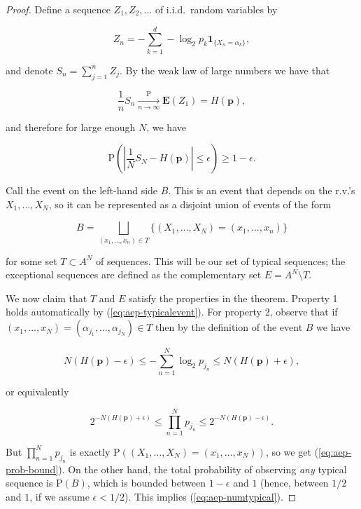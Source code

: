 \begin{proof}
Define a sequence $Z_1, Z_2, \ldots$ of i.i.d.\
random variables by

\[
Z_n = -\sum_{k=1}^d -\log_2 p_k \mathbf{1}_{\{X_n = \alpha_k\}},
\]

\noindent and denote $S_n = \sum_{j=1}^n Z_j$. By the weak law
of large numbers we have that

\[
\frac{1}{n} S_n \xrightarrow[n\to\infty]{\textrm{P}} \mathbf{E}(Z_1) = H(\mathbf{p}),
\]

\noindent and therefore for large enough $N$, we have

\begin{equation*} \tag{28}\label{eq:aep-typicalevent}
\mathrm{P}\left(\left|\frac{1}{N}S_N- H(\mathbf{p})\right|\le \epsilon \right)\ge 1-\epsilon.
\end{equation*}

\noindent Call the event on the left-hand side $B$. This is an
event that depends on the r.v.'s $X_1,\ldots,X_N$, so
it can be represented as a disjoint union of events of
the form

\[
B = \bigsqcup_{(x_1,\ldots,x_n)\in T} \{ (X_1,\ldots,X_N) = (x_1,\ldots,x_n) \}
\]

\noindent for some set $T\subset A^N$ of sequences. This will
be our set of typical sequences; the exceptional
sequences are defined as the complementary set
$E = A^N\setminus T$.

We now claim that $T$ and $E$ satisfy the properties
in the theorem. Property 1 holds automatically by
(\ref{eq:aep-typicalevent}). For property 2, observe that
if
$(x_1,\ldots,x_N)=(\alpha_{j_1},\ldots,\alpha_{j_N})\in
T$
then by the definition of the event $B$ we have

\[
N\left(H(\mathbf{p}) - \epsilon\right) \le
-\sum_{n=1}^N \log_2 p_{j_n} \le N\left(H(\mathbf{p}) + \epsilon\right),
\]

\noindent or equivalently

\[
2^{-N\left(H(\mathbf{p}) + \epsilon\right)} \le
\prod_{n=1}^N p_{j_n} \le
2^{-N\left(H(\mathbf{p}) - \epsilon\right)}.
\]

\noindent But $\prod_{n=1}^N p_{j_n}$ is exactly
$\mathrm{P}((X_1,\ldots,X_N)=(x_1,\ldots,x_N))$, so
we get (\ref{eq:aep-prob-bound}). On the other hand, the
total probability of observing \emph{any} typical sequence
is $\mathrm{P}(B)$, which is bounded between
$1-\epsilon$ and $1$ (hence, between $1/2$ and $1$,
if we assume $\epsilon<1/2$). This implies
(\ref{eq:aep-numtypical}).
\end{proof}

